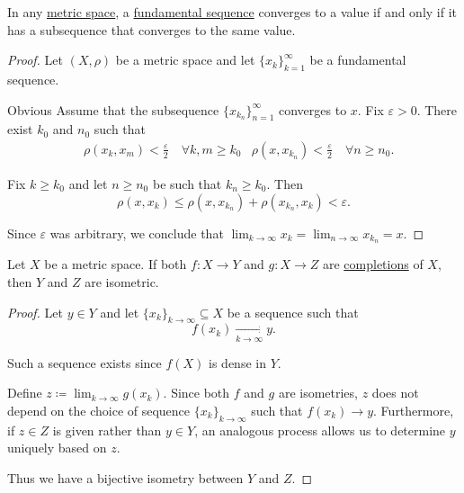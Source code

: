 \begin{proposition}\label{thm:fundamental_subsequence_convergence}
  In any \hyperref[def:complete_metric_space]{metric space}, a \hyperref[def:fundamental_net]{fundamental sequence} converges to a value if and only if it has a subsequence that converges to the same value.
\end{proposition}
\begin{proof}
  Let \( (X, \rho) \) be a metric space and let \( \{ x_k \}_{k=1}^\infty \) be a fundamental sequence.

  \Sufficiency Obvious
  \Necessity Assume that the subsequence \( \{ x_{k_n} \}_{n=1}^\infty \) converges to \( x \). Fix \( \varepsilon > 0 \). There exist \( k_0 \) and \( n_0 \) such that
  \begin{align*}
     & \rho(x_k, x_m) < \tfrac \varepsilon 2 \quad\forall k, m \geq k_0
     & \rho(x, x_{k_n}) < \tfrac \varepsilon 2 \quad\forall n \geq n_0.
  \end{align*}

  Fix \( k \geq k_0 \) and let \( n \geq n_0 \) be such that \( k_n \geq k_0 \). Then
  \begin{equation*}
    \rho(x, x_k) \leq \rho(x, x_{k_n}) + \rho(x_{k_n}, x_k) < \varepsilon.
  \end{equation*}

  Since \( \varepsilon \) was arbitrary, we conclude that \( \lim_{k \to \infty} x_k = \lim_{n \to \infty} x_{k_n} = x \).
\end{proof}

\begin{lemma}\label{thm:metric_space_completion_uniqueness}
  Let \( X \) be a metric space. If both \( f: X \to Y \) and \( g: X \to Z \) are \hyperref[def:complete_metric_space]{completions} of \( X \), then \( Y \) and \( Z \) are isometric.
\end{lemma}
\begin{proof}
  Let \( y \in Y \) and let \( \{ x_k \}_{k \to \infty} \subseteq X \) be a sequence such that
  \begin{equation*}
    f(x_k) \xrightarrow[k \to \infty]{} y.
  \end{equation*}

  Such a sequence exists since \( f(X) \) is dense in \( Y \).

  Define \( z \coloneqq \lim_{k \to \infty} g(x_k) \). Since both \( f \) and \( g \) are isometries, \( z \) does not depend on the choice of sequence \( \{ x_k \}_{k \to \infty} \) such that \( f(x_k) \to y \). Furthermore, if \( z \in Z \) is given rather than \( y \in Y \), an analogous process allows us to determine \( y \) uniquely based on \( z \).

  Thus we have a bijective isometry between \( Y \) and \( Z \).
\end{proof}


